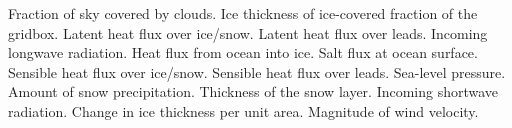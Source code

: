\begin{klist}
\begin{klist}
  \end{klist}
   \mbox{}
  \begin{klist}
       Fraction of sky covered by clouds.
        Ice thickness of ice-covered fraction of the
  gridbox.
          Latent heat flux over ice/snow.
    Latent heat flux over leads.
          Incoming longwave radiation.
       Heat flux from ocean into ice.
        Salt flux at ocean surface.
          Sensible heat flux over ice/snow.
    Sensible heat flux over leads.
               Sea-level pressure.
        Amount of snow precipitation.
       Thickness of the snow layer.
          Incoming shortwave radiation.
       Change in ice thickness per unit area.
       Magnitude of wind velocity.
  \end{klist}
\end{klist}

